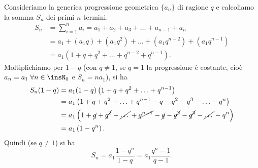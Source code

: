Consideriamo la generica progressione geometrica $\{a_n\}$ di ragione $q$ e calcoliamo la somma $S_n$ dei primi $n$ termini.
\begin{align*}
S_n&=\sum_{i=1}^{n}a_i=a_1+a_2+a_3+\ldots+a_{n-1}+a_n\\
&=a_1+\left(a_1q\right)+\left(a_1q^2\right)+\ldots+\left(a_1q^{n-2}\right)+\left(a_1q^{n-1}\right)\\
&=a_1\left(1+q+q^2+\ldots+q^{n-2}+q^{n-1}\right).
\end{align*}
Moltiplichiamo per $1-q$ (con $q \ne 1$, se $q=1$ la progressione è costante, cioè $a_n=a_1\;\forall n\in\insN_0$ e $S_n = na_1$), si ha
\begin{align*}
S_n(1-q)&=a_1(1-q)\left(1+q+q^2+\ldots+q^{n-1}\right)\\
&=a_1\left(1+q+q^2+\ldots+q^{n-1}-q-q^2-q^3-\ldots-q^n\right)\\
&=a_1\left(1+\cancel{q}+\cancel{q^2}+\cancel{\ldots\vphantom{q^n}}+\cancel{q^{n-1}}-\cancel{q}-\cancel{q^2}-\cancel{q^3}-\cancel{\ldots\vphantom{q^n}}-q^n\right)\\
&=a_1\left(1-q^n\right).
\end{align*}
Quindi (se $q\ne 1$) si ha
\[S_n=a_1\frac{1-q^n}{1-q}=a_1\frac{q^n-1}{q-1}.\]

\ovalbox{\risolvii \ref{ese:8a_progr.22}, \ref{ese:8a_progr.23}, \ref{ese:8a_progr.24}, \ref{ese:8a_progr.25}, \ref{ese:8a_progr.26}, \ref{ese:8a_progr.27}, \ref{ese:8a_progr.28}, \ref{ese:8a_progr.29}, \ref{ese:8a_progr.30}, \ref{ese:8a_progr.31}, \ref{ese:8a_progr.32}, \ref{ese:8a_progr.33}}

\newpage



\cleardoublepage